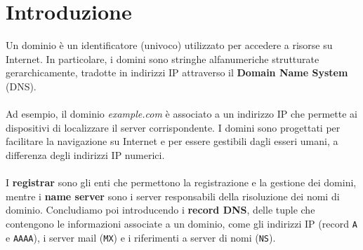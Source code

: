 \section*{Introduzione}
Un dominio è un identificatore (univoco) utilizzato per accedere a risorse su Internet. 
In particolare, i domini sono stringhe alfanumeriche strutturate gerarchicamente, 
tradotte in indirizzi IP attraverso il \textbf{Domain Name System} (DNS).
\\\\ 
Ad esempio, il dominio \textit{example.com} è associato a un indirizzo IP che permette ai dispositivi di localizzare il server 
corrispondente. I domini sono progettati per facilitare la navigazione su Internet e per essere 
gestibili dagli esseri umani, a differenza degli indirizzi IP numerici. 
\\\\
I \textbf{registrar} sono gli enti che permettono la registrazione 
e la gestione dei domini, mentre i \textbf{name server} sono i server responsabili 
della risoluzione dei nomi di dominio. Concludiamo poi introducendo i \textbf{record DNS}, 
delle tuple che contengono le informazioni associate a un dominio, come gli indirizzi IP (record \verb|A| e \verb|AAAA|), 
i server mail (\verb|MX|) e i riferimenti a server di nomi (\verb|NS|).

